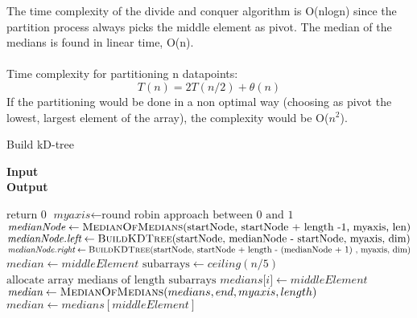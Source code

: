 \documentclass[11pt]{article}
\begin{document}
The time complexity of the divide and conquer algorithm is O(nlogn) since the partition process always picks the middle element as pivot. The median of the medians is found in linear time, O(n). 
\\\\
Time complexity for partitioning n datapoints:
\begin{equation} \label{eqn}
T(n) = 2T(n/2) + \theta(n)
\end{equation}
If the partitioning would be done in a non optimal way (choosing as pivot the lowest, largest element of the array), the complexity would be O($n^2$).
\begin{algorithm}[H]
\caption{Build kD-tree}
\hspace*{\algorithmicindent} \textbf{Input}  \\
\hspace*{\algorithmicindent} \textbf{Output} 
\begin{algorithmic}[1]
\Statex
{}
\State return 0
\EndIf
\Statex
\State $\textit{myaxis} \gets \text{round robin approach between 0 and 1}$
\Statex
\State $\textit{medianNode} \gets \Call{MedianOfMedians}{$startNode, startNode + length -1, myaxis, len$}$
\Statex
\State $\textit{medianNode.left} \gets \Call{BuildKDTree}{$startNode, medianNode - startNode, myaxis, dim$}$
\State $\textit{medianNode.right} \gets \Call{BuildKDTree}{$startNode, startNode + length - (medianNode + 1) , myaxis, dim$}$
\State \Return {}
\EndFunction
\Statex
{}
\State {}
\State $\textit{median} \gets middleElement$
\Else
\State $\text{subarrays} \gets ceiling(n/5)$
\State $\text{allocate array medians of length subarrays}$
\State {}
\State $\textit{medians[i]} \gets middleElement$
\EndFor
\Statex
{}
\State $\textit{median} \gets \Call{MedianOfMedians}{medians, end, myaxis, length}$
\Else
\State {}
\State $\textit{median} \gets medians[middleElement]$
\EndIf
\EndIf
\State \Return {}
\EndFunction
\Statex
{}
\State {}
\EndProcedure
\end{algorithmic}
\end{algorithm}
\end{document}
